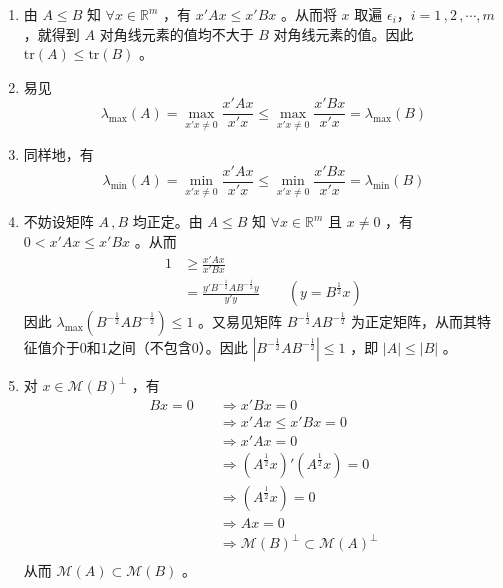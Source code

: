 \documentclass[12pt,hyperref,]{ctexart}
\begin{document}
\begin{enumerate}
\def\labelenumi{(\roman{enumi})}
\item
  由 \(A\le B\) 知 \(\forall x \in \mathbb{R}^m\) ，有 \(x'Ax \le x'Bx\)
  。从而将 \(x\) 取遍 \(\epsilon_i\text{，}i=1\, ,2\, ,\cdots ,m\)
  ，就得到 \(A\) 对角线元素的值均不大于 \(B\) 对角线元素的值。因此
  \(\mathrm{tr}(A) \le \mathrm{tr}(B)\) 。
\item
  易见 \begin{equation*}
  \lambda_{\max}(A)=\max_{x'x\ne 0}\frac{x'Ax}{x'x} \le \max_{x'x\ne 0}\frac{x'Bx}{x'x}=\lambda_{\max}(B)
  \end{equation*}
\item
  同样地，有 \begin{equation*}
  \lambda_{\min}(A)=\min_{x'x\ne 0}\frac{x'Ax}{x'x} \le \min_{x'x\ne 0}\frac{x'Bx}{x'x}=\lambda_{\min}(B)
  \end{equation*}
\item
  不妨设矩阵 \(A\, ,B\) 均正定。由 \(A\le B\) 知
  \(\forall x\in \mathbb{R}^m\) 且 \(x\ne 0\) ，有 \(0 < x'Ax \le x'Bx\)
  。从而 \begin{equation*}
  \begin{aligned}
  1 & \ge \frac{x'Ax}{x'Bx} \\
    & = \frac{y'B^{-\frac 12}AB^{-\frac 12}y}{y'y} \qquad (y=B^{\frac 12}x)
  \end{aligned}
  \end{equation*}因此
  \(\lambda_{\max}(B^{-\frac 12}AB^{-\frac 12})\le 1\) 。又易见矩阵
  \(B^{-\frac 12}AB^{-\frac 12}\)
  为正定矩阵，从而其特征值介于0和1之间（不包含0）。因此
  \(|B^{-\frac 12}AB^{-\frac 12}|\le 1\) ，即 \(|A|\le |B|\) 。
\item
  对 \(x\in \mathcal{M}(B)^{\perp}\) ，有 \begin{equation*}
  \begin{aligned}
  Bx=0 & \quad \Rightarrow x'Bx=0 \\
  & \quad \Rightarrow x'Ax \le x'Bx=0 \\
  & \quad \Rightarrow x'Ax=0 \\
  & \quad \Rightarrow (A^{\frac{1}{2}}x)'(A^{\frac{1}{2}}x)=0 \\
  & \quad \Rightarrow (A^{\frac{1}{2}}x)=0 \\
  & \quad \Rightarrow Ax=0 \\
  & \quad \Rightarrow \mathcal{M}(B)^{\perp} \subset \mathcal{M}(A)^{\perp} \\
  \end{aligned}
  \end{equation*}从而 \(\mathcal{M}(A)\subset \mathcal{M}(B)\) 。

\end{enumerate}
\end{document}
